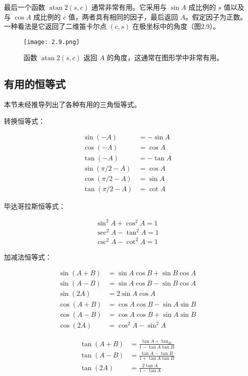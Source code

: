 \documentclass[lang=cn,10pt]{elegantbook}
\begin{document}
最后一个函数 $\operatorname{atan} 2(s,c)$ 通常非常有用。它采用与 $\sin A$ 成比例的 $s$ 值以及与 $\cos A$ 成比例的 $c$ 值，两者具有相同的因子，最后返回 $A$。假定因子为正数。一种看法是它返回了二维笛卡尔点 $(c,s)$ 在极坐标中的角度（图2.9）。

\begin{figure}[htbp]
\centering
\texttt{[image: 2.9.png]}
\caption{函数 $\operatorname{atan} 2(s,c)$ 返回 $A$ 的角度，这通常在图形学中非常有用。}
\end{figure}

\subsection{有用的恒等式}

本节未经推导列出了各种有用的三角恒等式。

转换恒等式：

$$
\begin{aligned}
\sin (-A) &=-\sin A \\
\cos (-A) &=\cos A \\
\tan (-A) &=-\tan A \\
\sin (\pi / 2-A) &=\cos A \\
\cos (\pi / 2-A) &=\sin A \\
\tan (\pi / 2-A) &=\cot A
\end{aligned}
$$

毕达哥拉斯恒等式：

$$
\begin{array}{r}
\sin ^{2} A+\cos ^{2} A=1 \\
\sec ^{2} A-\tan ^{2} A=1 \\
\csc ^{2} A-\cot ^{2} A=1
\end{array}
$$

加减法恒等式：

$$
\begin{aligned}
\sin (A+B) &=\sin A \cos B+\sin B \cos A \\
\sin (A-B) &=\sin A \cos B-\sin B \cos A \\
\sin (2 A) &=2 \sin A \cos A \\
\cos (A+B) &=\cos A \cos B-\sin A \sin B \\
\cos (A-B) &=\cos A \cos B+\sin A \sin B \\
\cos (2 A) &=\cos ^{2} A-\sin ^{2} A
\end{aligned}
$$

$$
\begin{aligned}
\tan (A+B) &=\frac{\tan A+\tan _{B}}{1-\tan A \tan B} \\
\tan (A-B) &=\frac{\tan A-\tan B}{1+\tan A \tan B} \\
\tan (2 A) &=\frac{2 \tan A}{1-\tan A}
\end{aligned}
$$
\end{document}
